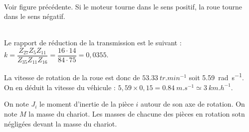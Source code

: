 \ifprof ~\\
Voir figure précédente. Si le moteur tourne dans le sens positif, la roue tourne dans le sens négatif. 
\else
\fi

\ifprof ~\\
Le rapport de réduction de la transmission est le suivant : 
$k=\dfrac{Z_{27} Z_{5} Z_{11} }{Z_{35} Z_{11} Z_{16}} = \dfrac{16\cdot 14}{84\cdot 75} =0,0355 $.

La vitesse de rotation de la roue est donc de $\SI{53,33}{tr.min^{-1}}$ soit \SI{5,59}{rad.s^{-1}}. 
On en déduit la vitesse du véhicule : $5,59 \times 0,15 = \SI{0,84}{m.s^{-1}}\simeq \SI{3}{km.h^{-1}}$.

\else
\fi


On note $J_i$ le moment d'inertie de la pièce $i$ autour de son axe de rotation. On note $M$ la masse du chariot. Les masses de chacune des pièces en rotation sotn négligées devant la masse du chariot.
\ifprof ~\\
\else
\fi

\ifprof ~\\
\else
\fi



\ifprof
\else


\fi